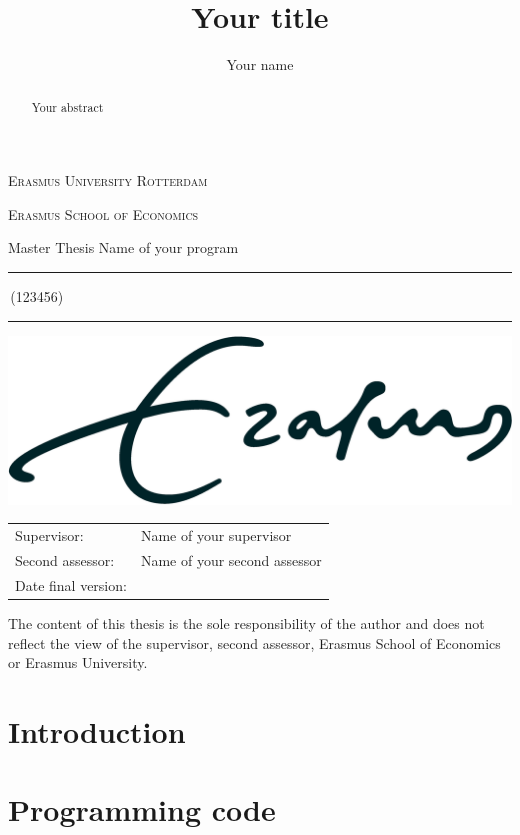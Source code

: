 \documentclass[a4paper,11pt]{report}
\author{Your name}
\title{Your title}
\newcommand{\studentnumber}{123456}
\newcommand{\program}{Name of your program}
\newcommand{\supervisor}{Name of your supervisor}
\newcommand{\secondassesor}{Name of your second assessor}
\begin{document}
\begin{titlepage}
\makeatletter
\begin{center}
	\textsc{Erasmus University Rotterdam}
	\par \textsc{Erasmus School of Economics}
	\par Master Thesis \program

	\vfill \hrule height .08em \bigskip
	\par\huge\@title\bigskip
	\par\Large\@author\,(\studentnumber)\bigskip
	\hrule height .08em\normalsize

	\vfill
	\includegraphics[width=\textwidth,height=0.15\textheight,keepaspectratio]{../eur} %
	\vfill

	\begin{tabular}{ll}
		\toprule
		Supervisor: & \supervisor\\
		Second assessor: & \secondassesor\\
		Date final version: & \@date\\
		\bottomrule
	\end{tabular}

	\vfill
	The content of this thesis is the sole responsibility of the author and does not reflect the view of the supervisor, second assessor, Erasmus School of Economics or Erasmus University.
\end{center}
\makeatother
\end{titlepage}

\begin{abstract}
	Your abstract
\end{abstract}

\tableofcontents

\chapter{Introduction}





\appendix
\chapter{Programming code}
\end{document}
